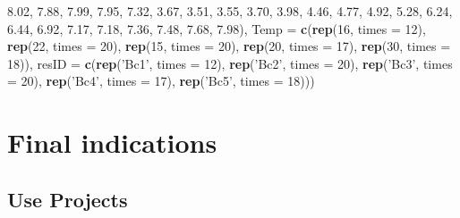 \documentclass[]{book}
\newenvironment{Shaded}{\begin{snugshade}}{\end{snugshade}}
\newcommand{\KeywordTok}[1]{\textcolor[rgb]{0.13,0.29,0.53}{\textbf{#1}}}
\newcommand{\DataTypeTok}[1]{\textcolor[rgb]{0.13,0.29,0.53}{#1}}
\newcommand{\DecValTok}[1]{\textcolor[rgb]{0.00,0.00,0.81}{#1}}
\newcommand{\FloatTok}[1]{\textcolor[rgb]{0.00,0.00,0.81}{#1}}
\newcommand{\StringTok}[1]{\textcolor[rgb]{0.31,0.60,0.02}{#1}}
\newcommand{\NormalTok}[1]{#1}
\theoremstyle{definition}
\theoremstyle{definition}
\theoremstyle{definition}
\theoremstyle{remark}
\begin{document}
\begin{Shaded}
\begin{Highlighting}[]
                            \FloatTok{8.02}\NormalTok{, }\FloatTok{7.88}\NormalTok{, }\FloatTok{7.99}\NormalTok{, }\FloatTok{7.95}\NormalTok{, }\FloatTok{7.32}\NormalTok{, }\FloatTok{3.67}\NormalTok{, }\FloatTok{3.51}\NormalTok{, }\FloatTok{3.55}\NormalTok{,}
                            \FloatTok{3.70}\NormalTok{, }\FloatTok{3.98}\NormalTok{, }\FloatTok{4.46}\NormalTok{, }\FloatTok{4.77}\NormalTok{, }\FloatTok{4.92}\NormalTok{, }\FloatTok{5.28}\NormalTok{, }\FloatTok{6.24}\NormalTok{, }\FloatTok{6.44}\NormalTok{,}
                            \FloatTok{6.92}\NormalTok{, }\FloatTok{7.17}\NormalTok{, }\FloatTok{7.18}\NormalTok{, }\FloatTok{7.36}\NormalTok{, }\FloatTok{7.48}\NormalTok{, }\FloatTok{7.68}\NormalTok{, }\FloatTok{7.98}\NormalTok{),}
                   \DataTypeTok{Temp =} \KeywordTok{c}\NormalTok{(}\KeywordTok{rep}\NormalTok{(}\DecValTok{16}\NormalTok{, }\DataTypeTok{times =} \DecValTok{12}\NormalTok{), }\KeywordTok{rep}\NormalTok{(}\DecValTok{22}\NormalTok{, }\DataTypeTok{times =} \DecValTok{20}\NormalTok{),}
                            \KeywordTok{rep}\NormalTok{(}\DecValTok{15}\NormalTok{, }\DataTypeTok{times =} \DecValTok{20}\NormalTok{), }\KeywordTok{rep}\NormalTok{(}\DecValTok{20}\NormalTok{, }\DataTypeTok{times =} \DecValTok{17}\NormalTok{),}
                            \KeywordTok{rep}\NormalTok{(}\DecValTok{30}\NormalTok{, }\DataTypeTok{times =} \DecValTok{18}\NormalTok{)),}
                   \DataTypeTok{resID =} \KeywordTok{c}\NormalTok{(}\KeywordTok{rep}\NormalTok{(}\StringTok{'Bc1'}\NormalTok{, }\DataTypeTok{times =} \DecValTok{12}\NormalTok{), }\KeywordTok{rep}\NormalTok{(}\StringTok{'Bc2'}\NormalTok{, }\DataTypeTok{times =} \DecValTok{20}\NormalTok{),}
                             \KeywordTok{rep}\NormalTok{(}\StringTok{'Bc3'}\NormalTok{, }\DataTypeTok{times =} \DecValTok{20}\NormalTok{), }\KeywordTok{rep}\NormalTok{(}\StringTok{'Bc4'}\NormalTok{, }\DataTypeTok{times =} \DecValTok{17}\NormalTok{),}
                             \KeywordTok{rep}\NormalTok{(}\StringTok{'Bc5'}\NormalTok{, }\DataTypeTok{times =} \DecValTok{18}\NormalTok{)))}
\end{Highlighting}
\end{Shaded}

\chapter{Final indications}\label{finalind}

\section{Use Projects}\label{use-projects}
\end{document}
